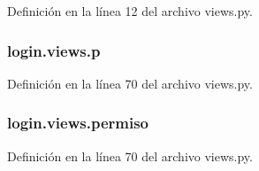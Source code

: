 Definición en la línea 12 del archivo views.\+py.

\subsubsection[{\texorpdfstring{p}{p}}]{\setlength{\rightskip}{0pt plus 5cm}login.\+views.\+p}\hypertarget{namespacelogin_1_1views_a62e13e2b774e30419cb19970d7a58971}{}\label{namespacelogin_1_1views_a62e13e2b774e30419cb19970d7a58971}


Definición en la línea 70 del archivo views.\+py.

\subsubsection[{\texorpdfstring{permiso}{permiso}}]{\setlength{\rightskip}{0pt plus 5cm}login.\+views.\+permiso}\hypertarget{namespacelogin_1_1views_aea88f2bb6aebe83405fe86f680e9b7a7}{}\label{namespacelogin_1_1views_aea88f2bb6aebe83405fe86f680e9b7a7}


Definición en la línea 70 del archivo views.\+py.

